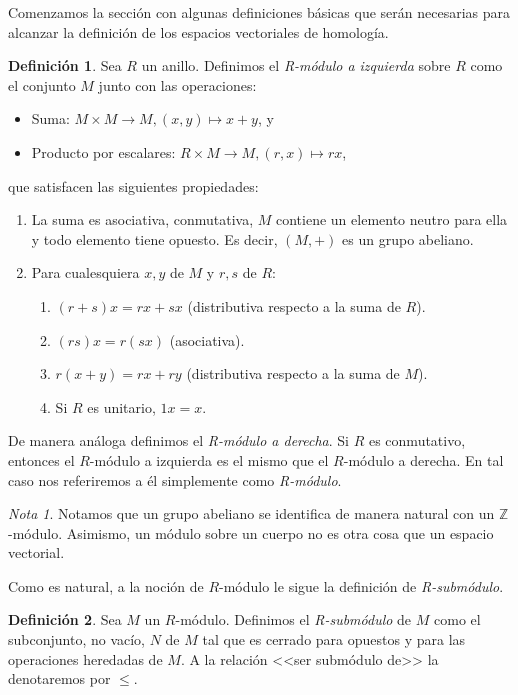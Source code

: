 \documentclass[12pt, a4paper, twoside]{book}
\numberwithin{equation}{section}
\theoremstyle{definition}
\newtheorem{defi}{Definición}[section]
\theoremstyle{remark}
\newtheorem*{remark}{Nota}
\theoremstyle{plain}
\begin{document}
	Comenzamos la sección con algunas definiciones básicas que serán 
	necesarias para alcanzar la definición de los espacios vectoriales de 
	homología.

	\begin{defi}
		Sea $R$ un anillo. Definimos el \textit{R-módulo a izquierda} 
		sobre
		$R$ como el conjunto $M$ junto con las operaciones:
		\begin{itemize}
			\item Suma: $M \times M \rightarrow M, (x,y) \mapsto 
				x+y$, y
			\item Producto por escalares: $R \times M \rightarrow 
				M, (r,x) \mapsto rx$,	
		\end{itemize}
		que satisfacen las siguientes propiedades:
		\begin{enumerate}
			\item La suma es asociativa, conmutativa, $M$ contiene
			      un elemento neutro para ella y todo elemento 
			      tiene opuesto. Es decir, $(M,+)$ es un grupo 
			      abeliano.
		      \item Para cualesquiera $x,y$ de $M$ y $r,s$ de $R$: 
		      	\begin{enumerate}
			 	\item $(r+s)x=rx+sx$ (distributiva respecto a 
					la suma de $R$).
				\item $(rs)x=r(sx)$ (asociativa).
				\item $r(x+y)=rx+ry$ (distributiva respecto a 
					la suma de $M$).
				\item Si $R$ es unitario, $1x=x$.	
			\end{enumerate}
		\end{enumerate}
		De manera análoga definimos el \textit{R-módulo a derecha}. Si 
		$R$ es conmutativo, entonces el $R$-módulo a izquierda es el 
		mismo que el $R$-módulo a derecha. En tal caso nos referiremos 
		a
		él simplemente como \textit{R-módulo}.
	\end{defi}

	\begin{remark}
		Notamos que un grupo abeliano se identifica de manera natural 
		con un $\mathbb{Z}$-módulo. Asimismo, un módulo sobre un 
		cuerpo no es otra cosa que un espacio vectorial. 	
	\end{remark}

	Como es natural, a la noción de $R$-módulo le sigue la definición de
	\emph{R-submódulo}.

	\begin{defi}
	Sea $M$ un $R$-módulo. Definimos el \textit{R-submódulo} de $M$ como 
	el subconjunto, no vacío, $N$ de $M$ tal que es cerrado para opuestos 
	y para las operaciones heredadas de $M$. A la relación <<ser submódulo 
	de>> la denotaremos por $\leq$.
	\end{defi}
\end{document}
